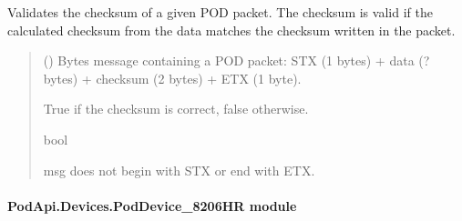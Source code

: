 \documentclass[letterpaper,10pt,english]{sphinxmanual}
\begin{document}
\begin{fulllineitems}
\begin{fulllineitems}
\label{\detokenize{PodApi.Devices:PodApi.Devices.BasicPodProtocol.Pod._ValidateChecksum}}
\pysigstartsignatures
{}
\pysigstopsignatures
\sphinxAtStartPar
Validates the checksum of a given POD packet. The checksum is valid if the calculated checksum
from the data matches the checksum written in the packet.
\begin{quote}\begin{description}
\sphinxAtStartPar
{} () \textendash{} Bytes message containing a POD packet: STX (1 bytes) + data (? bytes) + checksum                 (2 bytes) + ETX (1 byte).

\sphinxAtStartPar
True if the checksum is correct, false otherwise.

\sphinxAtStartPar
bool

\sphinxAtStartPar
{} \textendash{} msg does not begin with STX or end with ETX.

\end{description}\end{quote}

\end{fulllineitems}


\end{fulllineitems}



\paragraph{PodApi.Devices.PodDevice\_8206HR module}
\label{\detokenize{PodApi.Devices:module-PodApi.Devices.PodDevice_8206HR}}\label{\detokenize{PodApi.Devices:podapi-devices-poddevice-8206hr-module}}
\end{document}
